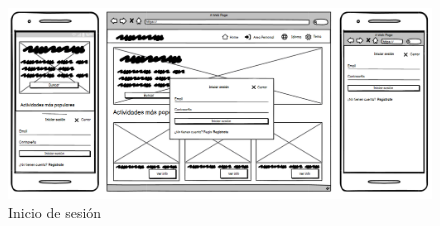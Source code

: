 \begin{figure}[H]
	\centering
	\includegraphics[width=0.8\linewidth]{5-AnalisisDelSistemaDeInformacion/InterfacesDeUsuario/InicioDeSesion/inicioDeSesion.png}
	\caption{Inicio de sesión}
\end{figure}